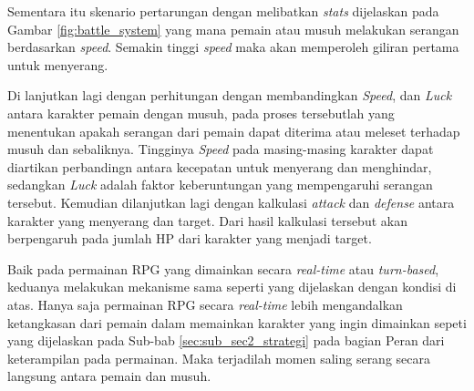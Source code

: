 \begin{subs}
\begin{enumerate}[label=\textbf{\arabic*).}]
		Sementara itu skenario pertarungan dengan melibatkan \textit{stats} dijelaskan pada Gambar \ref{fig:battle_system} yang mana pemain atau musuh melakukan serangan berdasarkan \textit{speed}. Semakin tinggi \textit{speed} maka akan memperoleh giliran pertama untuk menyerang.
		\vspace{1ex}
		
		Di lanjutkan lagi dengan perhitungan dengan membandingkan \textit{Speed}, dan \textit{Luck} antara karakter pemain dengan musuh, pada proses tersebutlah yang menentukan apakah serangan dari pemain dapat diterima atau meleset terhadap musuh dan sebaliknya. Tingginya \textit{Speed} pada masing-masing karakter dapat diartikan perbandingn antara kecepatan untuk menyerang dan menghindar, sedangkan \textit{Luck} adalah faktor keberuntungan yang mempengaruhi serangan tersebut. Kemudian dilanjutkan lagi dengan kalkulasi \textit{attack} dan \textit{defense} antara karakter yang menyerang dan target. Dari hasil kalkulasi tersebut akan berpengaruh pada jumlah HP dari karakter yang menjadi target.
		\vspace{1ex}
		
		Baik pada permainan RPG yang dimainkan secara \textit{real-time} atau \textit{turn-based}, keduanya melakukan mekanisme sama seperti yang dijelaskan dengan kondisi di atas. Hanya saja permainan RPG secara \textit{real-time} lebih mengandalkan ketangkasan dari pemain dalam memainkan karakter yang ingin dimainkan sepeti yang dijelaskan pada Sub-bab \ref{sec:sub_sec2_strategi} pada bagian Peran dari keterampilan pada permainan. Maka terjadilah momen saling serang secara langsung antara pemain dan musuh.
		\vspace{1ex}
		

\end{enumerate}
\end{subs}
